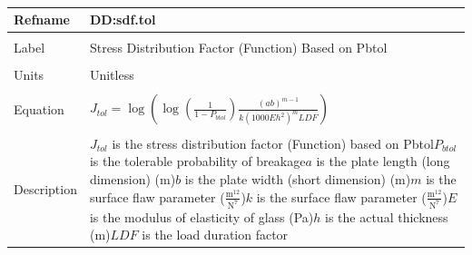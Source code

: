 \documentclass[12pt]{article}
\begin{document}
~\newline
\noindent \begin{minipage}{\textwidth}
\begin{tabular}{p{} p{}}
\toprule \textbf{Refname} & \textbf{DD:sdf.tol}
\label{DD:sdf.tol}
\\ \midrule \\
Label & Stress Distribution Factor (Function) Based on Pbtol
\\ \midrule \\
Units & Unitless
\\ \midrule \\
Equation & ${J_{tol}}=\log\left(\log\left(\frac{1}{1-{P_{btol}}}\right) \frac{\left(a b\right)^{m-1}}{k \left(1000 E h^{2}\right)^{m} LDF}\right)$
\\ \midrule \\
Description & ${J_{tol}}$ is the stress distribution factor (Function) based on Pbtol\newline${P_{btol}}$ is the tolerable probability of breakage\newline$a$ is the plate length (long dimension) (m)\newline$b$ is the plate width (short dimension) (m)\newline$m$ is the surface flaw parameter ($\frac{\text{m}^{12}}{\text{N}^{7}}$)\newline$k$ is the surface flaw parameter ($\frac{\text{m}^{12}}{\text{N}^{7}}$)\newline$E$ is the modulus of elasticity of glass (Pa)\newline$h$ is the actual thickness (m)\newline$LDF$ is the load duration factor
\\ \bottomrule \end{tabular}
\end{minipage}\\
\end{document}
